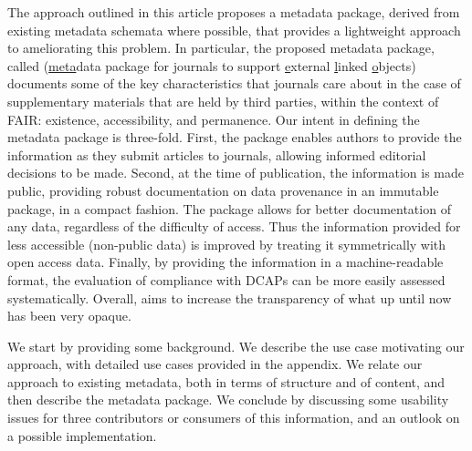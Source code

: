 The approach outlined in this article proposes a metadata package, derived from existing metadata schemata where possible, that provides a lightweight approach to ameliorating this problem. In particular, the proposed metadata package, called \metajelo (\underline{meta}data package for \underline{j}ournals to support \underline{e}xternal \underline{l}inked \underline{o}bjects) documents some of the key characteristics that journals care about in the case of supplementary materials that are held by third parties, within the context of FAIR: existence, accessibility, and permanence. Our intent in defining the metadata package is three-fold. First, the package enables  authors to provide the information as they submit articles to journals, allowing informed editorial decisions to be made. Second, at the time of publication, the information is made public, providing robust documentation on data provenance in an immutable package, in a compact fashion.  The package allows for better documentation of any data, regardless of the difficulty of access.   Thus the information provided for less accessible (non-public data) is improved by treating it symmetrically with open access data. Finally, by providing the information in a machine-readable format, the evaluation of compliance with \acp{DCAP} can be more easily assessed systematically. Overall, \metajelo aims to   increase the transparency of what up until now has been very opaque.

We start by providing some background. We describe the use case motivating our approach, with detailed use cases provided in the appendix. We relate our approach to existing metadata, both in terms of structure and of content, and then describe the metadata package. We conclude by discussing some usability issues for three contributors or consumers of this information, and an outlook on a possible implementation.